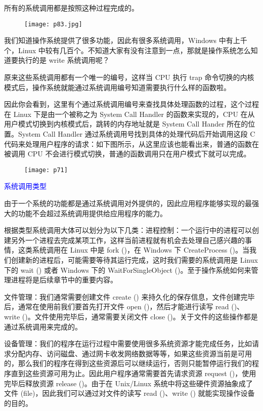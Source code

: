 \documentclass[utf8]{book}
\begin{document}
所有的系统调用都是按照这种过程完成的。

	\begin{figure}[H]
	\centering
	\texttt{[image: p83.jpg]}
\end{figure}



我们知道操作系统提供了很多功能，因此有很多系统调用，Windows 中有上千个，Linux 中较有几百个。不知道大家有没有注意到一点，那就是操作系统怎么知道要执行的是 write 系统调用呢？

原来这些系统调用都有一个唯一的编号，这样当 CPU 执行 trap 命令切换的内核模式后，操作系统就能通过系统调用编号知道需要执行什么样的函数啦。

因此你会看到，这里有个通过系统调用编号来查找具体处理函数的过程，这个过程在 Linux 下是由一个被称之为 System Call Handler 的函数来实现的，CPU 在从用户模式切换到内核模式后，跳转的内存地址就是 System Call Hander 所在的位置。System Call Handler 通过系统调用号找到具体的处理代码后开始调用这段 C 代码来处理用户程序的请求：如下图所示，从这里应该也能看出来，普通的函数在被调用 CPU 不会进行模式切换，普通的函数调用只在用户模式下就可以完成。

	\begin{figure}[H]
	\centering
	\texttt{[image: p71]}
\end{figure}


	\textcolor{blue}{系统调用类型}
	
	由于一个系统的功能都是通过系统调用对外提供的，因此应用程序能够实现的最强大的功能不会超过系统调用提供给应用程序的能力。
	
	根据类型系统调用大体可以划分为以下几类：进程控制：一个运行中的进程可以创建另外一个进程去完成某项工作，这样当前进程就有机会去处理自己感兴趣的事情，这类系统调用在 Linux 中是 fork ()，在 Windows 下 CreateProcess ()。当我们创建新的进程后，可能需要等待其运行完成，这时我们需要的系统调用是 Linux 下的 wait () 或者 Windows 下的 WaitForSingleObject ()。至于操作系统如何来管理进程将是后续章节中的重要内容。
	
	文件管理：我们通常需要创建文件 create () 来持久化的保存信息，文件创建完毕后，通常在使用前我们要首先打开文件 open ()，然后才能进行读写 read ()、write ()。文件使用完毕后，通常需要关闭文件 close ()。关于文件的这些操作都是通过系统调用来完成的。
	
	设备管理：我们的程序在运行过程中需要使用很多系统资源才能完成任务，比如请求分配内存、访问磁盘、通过网卡收发网络数据等等，如果这些资源当前是可用的，那么我们的程序在得到这些资源后可以继续运行，否则只能暂停运行我们的程序直到这些资源可用为止。因此用户程序通常需要首先请求资源 request ()，使用完毕后释放资源 release ()。由于在 Unix/Linux 系统中将这些硬件资源抽象成了文件 (file)，因此我们可以通过对文件的读写 read ()、write () 就能实现操作设备的目的。
	
\end{document}

